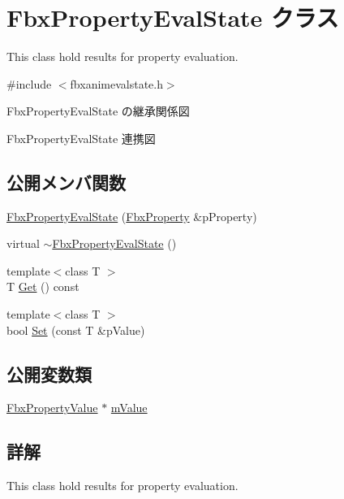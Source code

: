 \hypertarget{class_fbx_property_eval_state}{}\section{Fbx\+Property\+Eval\+State クラス}
\label{class_fbx_property_eval_state}


This class hold results for property evaluation.  




{\ttfamily \#include $<$fbxanimevalstate.\+h$>$}



Fbx\+Property\+Eval\+State の継承関係図


Fbx\+Property\+Eval\+State 連携図
\subsection*{公開メンバ関数}
\begin{DoxyCompactItemize}
\item 
\hyperlink{class_fbx_property_eval_state_a19bcf828df536753374ab2477750df11}{Fbx\+Property\+Eval\+State} (\hyperlink{class_fbx_property}{Fbx\+Property} \&p\+Property)
\item 
virtual \hyperlink{class_fbx_property_eval_state_ab93c8dad1b9c6a759ebae7fa78dc0d57}{$\sim$\+Fbx\+Property\+Eval\+State} ()
\item 
{\footnotesize template$<$class T $>$ }\\T \hyperlink{class_fbx_property_eval_state_ad844efab953b35bcb5539f0c5667db0b}{Get} () const
\item 
{\footnotesize template$<$class T $>$ }\\bool \hyperlink{class_fbx_property_eval_state_ae6e8cdc04a89d508399aeb2d125eb4b7}{Set} (const T \&p\+Value)
\end{DoxyCompactItemize}
\subsection*{公開変数類}
\begin{DoxyCompactItemize}
\item 
\hyperlink{class_fbx_property_value}{Fbx\+Property\+Value} $\ast$ \hyperlink{class_fbx_property_eval_state_a8b773480c867eff130caea6646f81cae}{m\+Value}
\end{DoxyCompactItemize}


\subsection{詳解}
This class hold results for property evaluation. 

